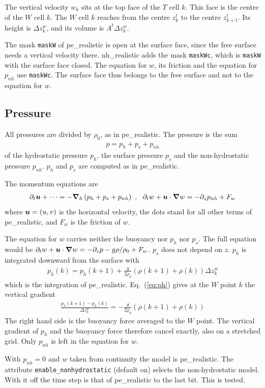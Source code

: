 \documentclass[12pt]{article}
\newcommand{\beq}  { \begin{eqnarray} }
\newcommand{\eeq}  { \end{eqnarray}}
\newcommand{\eq }  [1]{Eq.~(\ref{#1})}  %
\renewcommand{\v}[1]{{\mbox{\boldmath$ #1 $}}}  %
\newcommand{\pt}[1]{{\partial_t #1}}
\newcommand{\pz}[1]{{\partial_z #1}}
\newcommand{\vn}{{\v \nabla}}
\newcommand{\lk}{\left(}
\newcommand{\rk}{\right)}
\begin{document}
The vertical velocity $w_k$ sits at the top face of the $T$ cell $k$.
This face is the centre of the $W$ cell $k$.
The $W$ cell $k$ reaches from the centre $z^t_k$ to the centre $z^t_{k+1}$.
Its height is $\Delta z^w_k$, and its volume is $A^t \Delta z^w_k$.

The mask \verb|maskW| of pe\_realistic is open at the surface face, since the free surface needs a vertical velocity there.
nh\_realistic adds the mask \verb|maskWc|, which is \verb|maskW| with the surface face closed.
The equation for $w$, its friction and the equation for $p_{nh}$ use \verb|maskWc|.
The surface face thus belongs to the free surface and not to the equation for $w$.

\subsection*{Pressure}

All pressures are divided by $\rho_0$, as in pe\_realistic.
The pressure is the sum
\beq
 p = p_h + p_s + p_{nh}
\eeq
of the hydrostatic pressure $p_h$, the surface pressure $p_s$ and the non-hydrostatic pressure $p_{nh}$.
$p_h$ and $p_s$ are computed as in pe\_realistic.

The momentum equations are
\beq \label{eq:mom}
 \pt{\v u} + \dots = - \vn_h \lk p_h + p_s + p_{nh} \rk ~,~~
 \pt w + \v u \cdot \vn w = - \pz{p_{nh}} + F_w
\eeq
where $\v u = (u,v)$ is the horizontal velocity, the dots stand for all other terms of pe\_realistic, and $F_w$ is the friction of $w$.

The equation for $w$ carries neither the buoyancy nor $p_h$ nor $p_s$.
The full equation would be $\pt w + \v u \cdot \vn w = - \pz p - g \rho/\rho_0 + F_w$.
$p_s$ does not depend on $z$.
$p_h$ is integrated downward from the surface with
\beq \label{eq:ph}
 p_h(k) = p_h(k+1) + \frac{g}{2 \rho_0} \lk \rho(k+1) + \rho(k) \rk \Delta z^w_k
\eeq
which is the integration of pe\_realistic.
\eq{eq:ph} gives at the $W$ point $k$ the vertical gradient
\beq
 \frac{p_h(k+1) - p_h(k)}{\Delta z^w_k} = - \frac{g}{2 \rho_0} \lk \rho(k+1) + \rho(k) \rk
\eeq
The right hand side is the buoyancy force averaged to the $W$ point.
The vertical gradient of $p_h$ and the buoyancy force therefore cancel exactly, also on a stretched grid.
Only $p_{nh}$ is left in the equation for $w$.

With $p_{nh} = 0$ and $w$ taken from continuity the model is pe\_realistic.
The attribute \verb|enable_nonhydrostatic| (default on) selects the non-hydrostatic model.
With it off the time step is that of pe\_realistic to the last bit.
This is tested.
\end{document}
